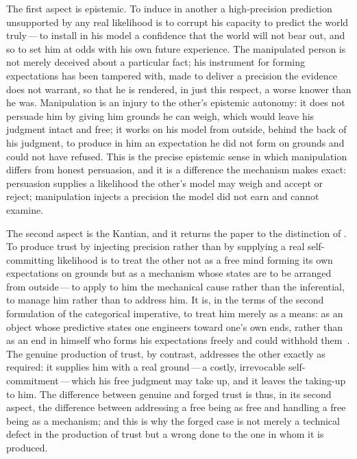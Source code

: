 The first aspect is epistemic. To induce in another a high-precision prediction unsupported by any real likelihood is to corrupt his capacity to predict the world truly\,---\,to install in his model a confidence that the world will not bear out, and so to set him at odds with his own future experience. The manipulated person is not merely deceived about a particular fact; his instrument for forming expectations has been tampered with, made to deliver a precision the evidence does not warrant, so that he is rendered, in just this respect, a worse knower than he was. Manipulation is an injury to the other's epistemic autonomy: it does not persuade him by giving him grounds he can weigh, which would leave his judgment intact and free; it works on his model from outside, behind the back of his judgment, to produce in him an expectation he did not form on grounds and could not have refused. This is the precise epistemic sense in which manipulation differs from honest persuasion, and it is a difference the mechanism makes exact: persuasion supplies a likelihood the other's model may weigh and accept or reject; manipulation injects a precision the model did not earn and cannot examine.

The second aspect is the Kantian, and it returns the paper to the distinction of . To produce trust by injecting precision rather than by supplying a real self-committing likelihood is to treat the other not as a free mind forming its own expectations on grounds but as a mechanism whose states are to be arranged from outside\,---\,to apply to him the mechanical cause rather than the inferential, to manage him rather than to address him. It is, in the terms of the second formulation of the categorical imperative, to treat him merely as a means: as an object whose predictive states one engineers toward one's own ends, rather than as an end in himself who forms his expectations freely and could withhold them~\parencite{kant1998}. The genuine production of trust, by contrast, addresses the other exactly as  required: it supplies him with a real ground\,---\,a costly, irrevocable self-commitment\,---\,which his free judgment may take up, and it leaves the taking-up to him. The difference between genuine and forged trust is thus, in its second aspect, the difference between addressing a free being as free and handling a free being as a mechanism; and this is why the forged case is not merely a technical defect in the production of trust but a wrong done to the one in whom it is produced.

